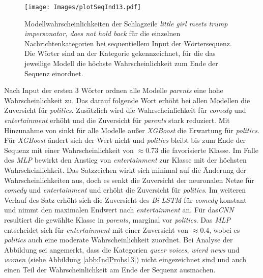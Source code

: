 \documentclass[a4paper,11pt]{article}
\begin{document}
\begin{figure}[!ht]
    \centering
\texttt{[image: Images/plotSeqInd13.pdf]} 
\caption{Modellwahrscheinlichkeiten der Schlagzeile \textit{little girl meets trump impersonator, does not hold back} für die einzelnen Nachrichtenkategorien bei sequentiellem Input der Wörtersequenz. Die Wörter sind an der Kategorie gekennzeichnet, für die das jeweilige Modell die höchste Wahrscheinlichkeit zum Ende der Sequenz einordnet.}
\label{abb:plotSeqInd13}
\end{figure}

Nach Input der ersten $3$ Wörter  ordnen alle Modelle \textit{parents} eine hohe Wahrscheinlichkeit zu. Das darauf folgende Wort  erhöht bei allen Modellen die Zuversicht für \textit{politics}. Zusätzlich wird die Wahrscheinlichkeit für \textit{comedy} und \textit{entertainment} erhöht und die Zuversicht für \textit{parents} stark reduziert. Mit Hinzunahme von  sinkt für alle Modelle außer \textit{XGBoost} die Erwartung für \textit{politics}. Für \textit{XGBoost} ändert sich der Wert nicht und \textit{politics} bleibt bis zum Ende der Sequenz mit einer Wahrscheinlichkeit von $\approx 0.73$ die favorisierte Klasse. Im Falle des \textit{MLP} bewirkt  den Anstieg von \textit{entertainment} zur Klasse mit der höchsten Wahrscheinlichkeit. Das Satzzeichen \say{\textit{,}} wirkt sich minimal auf die Änderung der Wahrscheinlichkeiten aus, doch es senkt die Zuversicht der neuronalen Netze für \textit{comedy} und \textit{entertainment} und erhöht die Zuversicht für \textit{politics}. Im weiteren Verlauf des Satz erhöht sich die Zuversicht des \textit{Bi-LSTM} für \textit{comedy} konstant und nimmt den maximalen Endwert nach \textit{entertainment} an. Für das\textit{CNN} resultiert die gewählte Klasse in \textit{parents}, marginal vor \textit{politics}. Das \textit{MLP} entscheidet sich für \textit{entertainment} mit einer Zuversicht von $\approx 0.4$, wobei es \textit{politics} auch eine moderate Wahrscheinlichkeit zuordnet. Bei Analyse der Abbildung sei angemerkt, dass die Kategorien \textit{queer voices}, \textit{wierd news} und \textit{women} (siehe Abbildung \ref{abb:IndProbs13}) nicht eingezeichnet sind und auch einen Teil der Wahrscheinlichkeit am Ende der Sequenz ausmachen.\\
\end{document}

